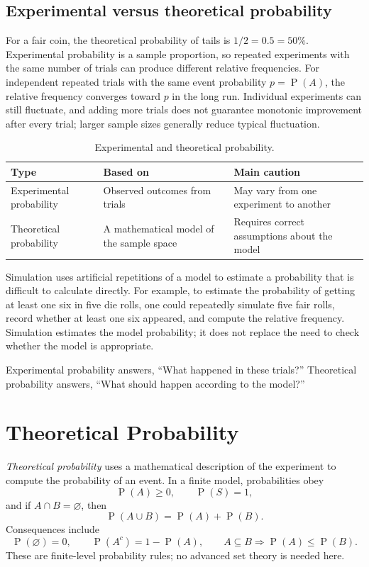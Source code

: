 \documentclass[11pt]{article}
\newcommand{\Pp}{\operatorname{P}}
\begin{document}
\subsection{Experimental versus theoretical probability}
For a fair coin, the theoretical probability of tails is $1/2=0.5=50\%$.
Experimental probability is a sample proportion, so repeated experiments with
the same number of trials can produce different relative frequencies.  For
independent repeated trials with the same event probability $p=\Pp(A)$, the
relative frequency converges toward $p$ in the long run.  Individual experiments
can still fluctuate, and adding more trials does not guarantee monotonic
improvement after every trial; larger sample sizes generally reduce typical
fluctuation.

\begin{table}[ht]
\centering
\caption{Experimental and theoretical probability.}\label{tab:exp-theory}
\begin{tabularx}{\textwidth}{@{}lYY@{}}
\toprule
Type & Based on & Main caution \\
\midrule
Experimental probability & Observed outcomes from trials & May vary from one experiment to another \\
Theoretical probability & A mathematical model of the sample space & Requires correct assumptions about the model \\
\bottomrule
\end{tabularx}
\end{table}

Simulation uses artificial repetitions of a model to estimate a probability that
is difficult to calculate directly.  For example, to estimate the probability of
getting at least one six in five die rolls, one could repeatedly simulate five
fair rolls, record whether at least one six appeared, and compute the relative
frequency.  Simulation estimates the model probability; it does not replace the
need to check whether the model is appropriate.

\begin{keybox}
Experimental probability answers, ``What happened in these trials?''  Theoretical
probability answers, ``What should happen according to the model?''
\end{keybox}

\section{Theoretical Probability}\label{sec:theoretical}
\emph{Theoretical probability} uses a mathematical description of the experiment
to compute the probability of an event.  In a finite model, probabilities obey
\[
\Pp(A)\geq0,\qquad \Pp(S)=1,
\]
and if $A\cap B=\varnothing$, then
\[
\Pp(A\cup B)=\Pp(A)+\Pp(B).
\]
Consequences include
\[
\Pp(\varnothing)=0,\qquad \Pp(A^c)=1-\Pp(A),\qquad
A\subseteq B\Longrightarrow \Pp(A)\leq \Pp(B).
\]
These are finite-level probability rules; no advanced set theory is needed here.
\end{document}
